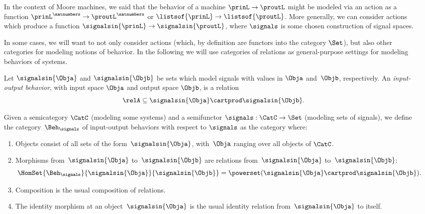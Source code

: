 
   
In the context of Moore machines, we said that the behavior of a machine $\prinL \to \proutL$ might be modeled via an action as a function $\prinL^\natnumbers \to \proutL^\natnumbers$ or $\listsof{\prinL} \to \listsof{\proutL}$. More generally, we can consider actions which produce a function $\signalsin{\prinL} \to \signalsin{\proutL}$, where $\signals$ is some chosen construction of signal spaces. 

In some cases, we will want to not only consider actions (which, by definition are functors into the category $\Set$), but also other categories for modeling notions of behavior. In the following we will use categories of relations as general-purpose settings for modeling behaviors of systems. 

    \begin{definition}
        Let $\signalsin{\Obja}$ and $\signalsin{\Objb}$ be sets which model signals with values in $\Obja$ and~$\Objb$, respectively. 
        An \emph{input-output behavior}, with input space $\Obja$ and output space $\Objb$, is a relation
        \begin{equation*}
            \relA \subseteq \signalsin{\Obja} \cartprod \signalsin{\Objb}.
        \end{equation*}
    \end{definition}

    \begin{definition}
       Given a semicategory $\CatC$ (modeling some systems) and a semifunctor $\signals: \CatC \to \Set$ (modeling sets of signals), we define the category~$\Beh_\signals$ of input-output behaviors with respect to $\signals$ as the category where:
        \begin{enumerate}
            \item Objects consist of all sets of the form~$\signalsin{\Obja}$, with~$\Obja$ ranging over all objects of $\CatC$.
            \item Morphisms from~$\signalsin{\Obja}$ to~$\signalsin{\Objb}$ are relations from~$\signalsin{\Obja}$ to~$\signalsin{\Objb}$:
                  \begin{equation}
                      \HomSet{\Beh_\signals}{\signalsin{\Obja}}{\signalsin{\Objb}} = \powerset (\signalsin{\Obja} \cartprod \signalsin{\Objb}).
                  \end{equation}
            \item Composition is the usual composition of relations.
            \item The identity morphism at an object~$\signalsin{\Obja}$ is the usual identity relation from~$\signalsin{\Obja}$ to itself.
        \end{enumerate}
    \end{definition}

